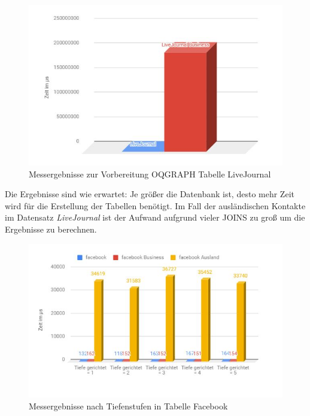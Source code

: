 \begin{figure}
	\centering
	\includegraphics[width=\textwidth]{images/LiJouvor.jpg}
	\caption{Messergebnisse zur Vorbereitung OQGRAPH Tabelle LiveJournal}
	\label{fig:LiJouvor}
\end{figure}

Die Ergebnisse sind wie erwartet: Je größer die Datenbank ist, desto mehr Zeit wird für die Erstellung der Tabellen benötigt. Im Fall der ausländischen Kontakte im Datensatz \emph{LiveJournal} ist der Aufwand aufgrund vieler JOINS zu groß um die Ergebnisse zu berechnen.

\begin{figure}
	\centering
	\includegraphics[width=\textwidth]{images/face.jpg}
	\caption{Messergebnisse nach Tiefenstufen in Tabelle Facebook}
	\label{fig:face}
\end{figure}

